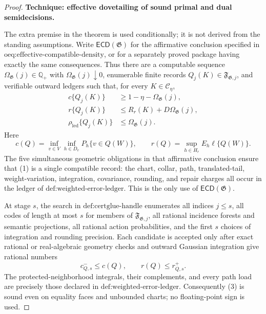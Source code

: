 \documentclass{article}
\begin{document}
\begin{proof}
\textbf{Technique: effective dovetailing of sound primal and dual semidecisions.}

The extra premise in the theorem is used conditionally; it is not derived from the standing assumptions.  Write \(\mathsf{ECD}(\mathfrak G)\) for the affirmative conclusion specified in \(\text{oeq:effective-compatible-density}\), or for a separately proved package having exactly the same consequences.  Thus there are a computable sequence \(\Omega_{\mathfrak G}(j)\in\mathbb Q_+\) with \(\Omega_{\mathfrak G}(j)\downarrow0\), enumerable finite records \(Q_j(K)\in\mathfrak F_{\mathfrak G,j}\), and verifiable outward ledgers such that, for every \(K\in\mathcal C_\eta\),
\[
 \begin{split}
 c\{Q_j(K)\}&\ge 1-\eta-\Omega_{\mathfrak G}(j),\\
 r\{Q_j(K)\}&\le R_r(K)+D\Omega_{\mathfrak G}(j),\\
 \rho_{\mathrm{led}}\{Q_j(K)\}&\le \Omega_{\mathfrak G}(j).
 \end{split}
 \tag{1}
\]
Here
\[
 c(Q)=\inf_{v\in V}\inf_{h\in D_v}P_h\{v\in Q(W)\},
 \qquad
 r(Q)=\sup_{h\in H_r}E_h\ell\{Q(W)\}.
 \tag{2}
\]
The five simultaneous geometric obligations in that affirmative conclusion ensure that (1) is a single compatible record: the chart, collar, path, translated-tail, weight-variation, integration, covariance, rounding, and repair charges all occur in the ledger of \(\text{def:weighted-error-ledger}\).  This is the only use of \(\mathsf{ECD}(\mathfrak G)\).

At stage \(s\), the search in \(\text{def:certglue-handle}\) enumerates all indices \(j\le s\), all codes of length at most \(s\) for members of \(\mathfrak F_{\mathfrak G,j}\), all rational incidence forests and semantic projections, all rational action probabilities, and the first \(s\) choices of integration and rounding precision.  Each candidate is accepted only after exact rational or real-algebraic geometry checks and outward Gaussian integration give rational numbers
\[
 c^-_{Q,s}\le c(Q),
 \qquad
 r(Q)\le r^+_{Q,s}.
 \tag{3}
\]
The protected-neighborhood integrals, their complements, and every path load are precisely those declared in \(\text{def:weighted-error-ledger}\).  Consequently (3) is sound even on equality faces and unbounded charts; no floating-point sign is used.


\end{proof}
\end{document}
